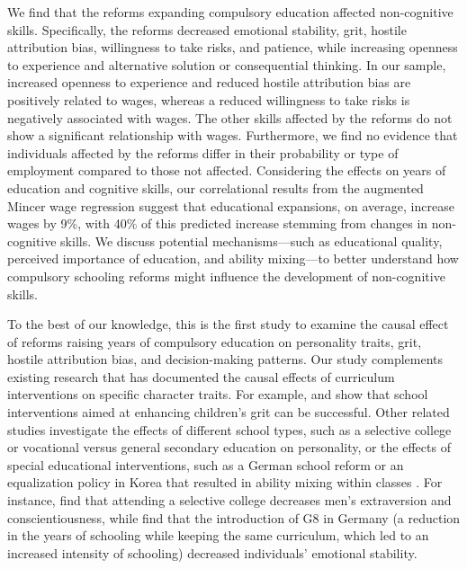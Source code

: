 We find that the reforms expanding compulsory education affected non-cognitive skills. Specifically, the reforms decreased emotional stability, grit, hostile attribution bias, willingness to take risks, and patience, while increasing openness to experience and alternative solution or consequential thinking. In our sample, increased openness to experience and reduced hostile attribution bias are positively related to wages, whereas a reduced willingness to take risks is negatively associated with wages. The other skills affected by the reforms do not show a significant relationship with wages. Furthermore, we find no evidence that individuals affected by the reforms differ in their probability or type of employment compared to those not affected. Considering the effects on years of education and cognitive skills, our correlational results from the augmented Mincer wage regression suggest that educational expansions, on average, increase wages by 9\%, with 40\% of this predicted increase stemming from changes in non-cognitive skills. We discuss potential mechanisms---such as educational quality, perceived importance of education, and ability mixing---to better understand how compulsory schooling reforms might influence the development of non-cognitive skills.

To the best of our knowledge, this is the first study to examine the causal effect of reforms raising years of compulsory education on personality traits, grit, hostile attribution bias, and decision-making patterns. Our study complements existing research that has documented the causal effects of curriculum interventions on specific character traits. For example, \citet{alan_ever_2019} and \citet{santos_can_2022} show that school interventions aimed at enhancing children's grit can be successful. Other related studies investigate the effects of different school types, such as a selective college or vocational versus general secondary education \parencite{dasgupta_effects_2022, ollikainen_effect_2024} on personality, or the effects of special educational interventions, such as a German school reform or an equalization policy in Korea that resulted in ability mixing within classes \parencite{dahmann_impact_2014, dahmann_cross-fertilizing_2018, ahn_long-term_2021}. For instance, \citet{dasgupta_effects_2022} find that attending a selective college decreases men's extraversion and conscientiousness, while \citet{dahmann_cross-fertilizing_2018} find that the introduction of G8 in Germany (a reduction in the years of schooling while keeping the same curriculum, which led to an increased intensity of schooling) decreased individuals' emotional stability.


